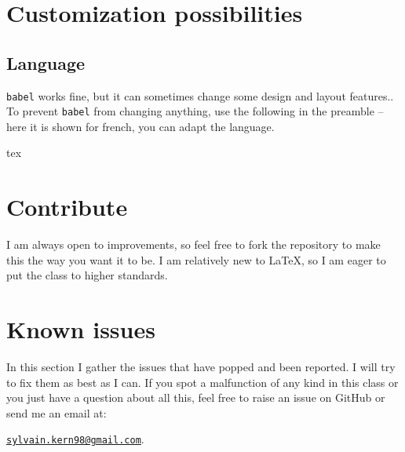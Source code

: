 \documentclass[
	raggedright,
	twoside,
	12pt,
	colorful,
]{tufte-style-article}
\begin{document}
\section{Customization possibilities}
\label{sec:customization-possibilities}

\subsection{Language}

\texttt{babel} works fine, but it can sometimes change some design and layout features.. To prevent \texttt{babel} from changing anything, use the following in the preamble --here it is shown for french, you can adapt the language.
\begin{codebox}{tex}
\end{codebox}


\section{Contribute}
\label{sec:contribute}

I am always open to improvements, so feel free to fork the repository to make this the way you want it to be. I am relatively new to \LaTeX{}, so I am eager to put the class to higher standards.


\section{Known issues}
\label{sec:known-issues}

In this section I gather the issues that have popped and been reported. I will try to fix them as best as I can. If you spot a malfunction of any kind in this class or you just have a question about all this, feel free to raise an issue on GitHub or send me an email at:

\href{mailto:sylvain.kern98@gmail.com}{\texttt{sylvain.kern98@gmail.com}}.

\bigskip
\end{document}
